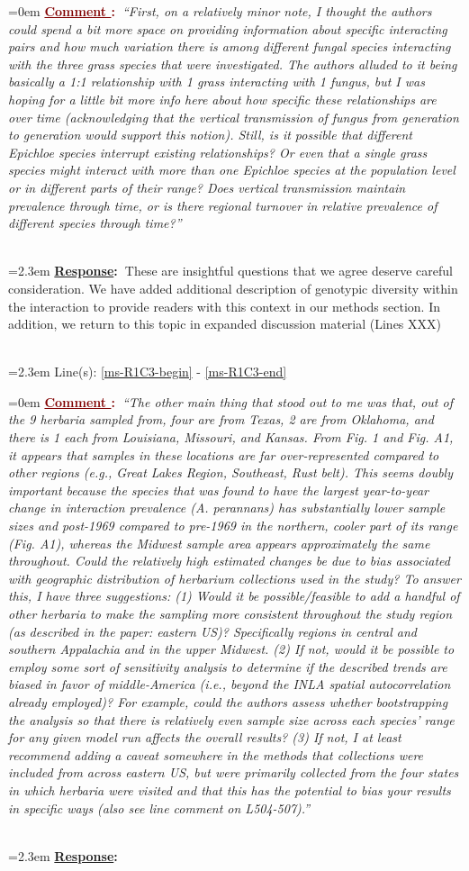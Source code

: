 \documentclass[12pt]{article}
\newcounter{cN}
\newcommand{\comment}[1]{
	\vspace{2em}
	\refstepcounter{cN} %
	\noindent \hangindent=0em \textbf{\textcolor{Maroon}{\uline{Comment \thecN}:~}}\emph{``#1''}
	}
\newcommand{\response}[1]{
	\\[0.25em]
	\hangindent=2.3em \textbf{\textcolor{NavyBlue}{\uline{Response}:~}}#1
	}
\newcommand{\linesref}[2]{
		\\[0.25em]
	\hangindent=2.3em {\color{Mahogany} Line(s): \ref{#1} - \ref{#2}}
}
\begin{document}
 \comment{First, on a relatively minor note, I thought the authors could spend a bit more space on providing information about specific interacting pairs and how much variation there is among different fungal species interacting with the three grass species that were investigated. The authors alluded to it being basically a 1:1 relationship with 1 grass interacting with 1 fungus, but I was hoping for a little bit more info here about how specific these relationships are over time (acknowledging that the vertical transmission of fungus from generation to generation would support this notion). Still, is it possible that different Epichloe species interrupt existing relationships? Or even that a single grass species might interact with more than one Epichloe species at the population level or in different parts of their range? Does vertical transmission maintain prevalence through time, or is there regional turnover in relative prevalence of different species through time?}
\response{These are insightful questions that we agree deserve careful consideration. We have added additional description of genotypic diversity within the interaction to provide readers with this context in our methods section. In addition, we return to this topic in expanded discussion material (Lines XXX)}
\linesref{ms-R1C3-begin}{ms-R1C3-end}



\comment{The other main thing that stood out to me was that, out of the 9 herbaria sampled from, four are from Texas, 2 are from Oklahoma, and there is 1 each from Louisiana, Missouri, and Kansas. From Fig. 1 and Fig. A1, it appears that samples in these locations are far over-represented compared to other regions (e.g., Great Lakes Region, Southeast, Rust belt). This seems doubly important because the species that was found to have the largest year-to-year change in interaction prevalence (A. perannans) has substantially lower sample sizes and post-1969 compared to pre-1969 in the northern, cooler part of its range (Fig. A1), whereas the Midwest sample area appears approximately the same throughout. Could the relatively high estimated changes be due to bias associated with geographic distribution of herbarium collections used in the study? To answer this, I have three suggestions: (1) Would it be possible/feasible to add a handful of other herbaria to make the sampling more consistent throughout the study region (as described in the paper: eastern US)? Specifically regions in central and southern Appalachia and in the upper Midwest. (2) If not, would it be possible to employ some sort of sensitivity analysis to determine if the described trends are biased in favor of middle-America (i.e., beyond the INLA spatial autocorrelation already employed)? For example, could the authors assess whether bootstrapping the analysis so that there is relatively even sample size across each species’ range for any given model run affects the overall results? (3) If not, I at least recommend adding a caveat somewhere in the methods that collections were included from across eastern US, but were primarily collected from the four states in which herbaria were visited and that this has the potential to bias your results in specific ways (also see line comment on L504-507).}
\response{}
\end{document}
